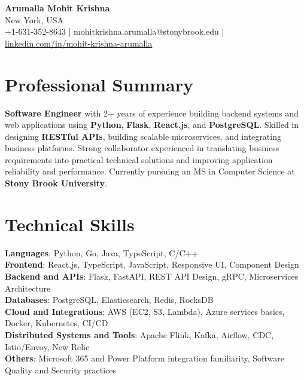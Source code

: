 \documentclass[letterpaper,11pt]{article}
\begin{document}
\begin{center}
  {\Large \textbf{Arumalla Mohit Krishna}} \\
  New York, USA \\
  +1-631-352-8643 \enspace | \enspace mohitkrishna.arumalla@stonybrook.edu \enspace | \enspace \href{https://www.linkedin.com/in/mohit-krishna-arumalla}{linkedin.com/in/mohit-krishna-arumalla}
\end{center}

\section{Professional Summary}
  \begin{itemize}[leftmargin=0.15in, label={}]
    \small{\item{
     \textbf{Software Engineer} with 2+ years of experience building backend systems and web applications using \textbf{Python}, \textbf{Flask}, \textbf{React.js}, and \textbf{PostgreSQL}. Skilled in designing \textbf{RESTful APIs}, building scalable microservices, and integrating business platforms. Strong collaborator experienced in translating business requirements into practical technical solutions and improving application reliability and performance. Currently pursuing an MS in Computer Science at \textbf{Stony Brook University}.
    }}
  \end{itemize}
\vspace{-16pt}

\section{Technical Skills}
 \begin{itemize}[leftmargin=0.15in, label={}]
    \small{\item{
     \textbf{Languages}: Python, Go, Java, TypeScript, C/C++ \\
     \textbf{Frontend}: React.js, TypeScript, JavaScript, Responsive UI, Component Design \\
     \textbf{Backend and APIs}: Flask, FastAPI, REST API Design, gRPC, Microservices Architecture \\
     \textbf{Databases}: PostgreSQL, Elasticsearch, Redis, RocksDB \\
     \textbf{Cloud and Integrations}: AWS (EC2, S3, Lambda), Azure services basics, Docker, Kubernetes, CI/CD \\
     \textbf{Distributed Systems and Tools}: Apache Flink, Kafka, Airflow, CDC, Istio/Envoy, New Relic \\
     \textbf{Others}: Microsoft 365 and Power Platform integration familiarity, Software Quality and Security practices
    }}
 \end{itemize}
\vspace{-16pt}
\end{document}
